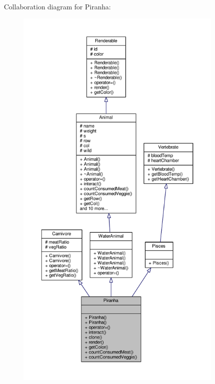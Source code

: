 Collaboration diagram for Piranha\+:
\nopagebreak
\begin{figure}[H]
\begin{center}
\leavevmode
\includegraphics[height=550pt]{classPiranha__coll__graph}
\end{center}
\end{figure}
